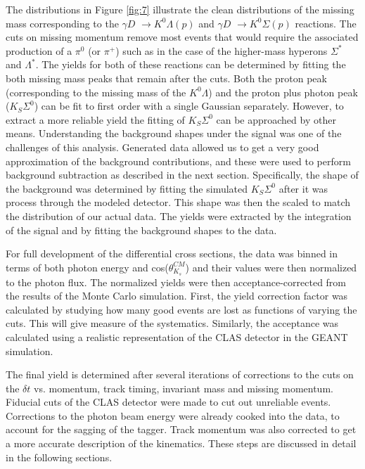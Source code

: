 \documentclass[prb,10pt,twocolumn,tightenlines,superscriptaddress]{revtex4-1}
\begin{document}
The distributions in Figure \ref{fig:7} illustrate the clean distributions of the missing mass corresponding to the $\gamma D$ $\longrightarrow K^{0}\Lambda(p)$ and $\gamma D$ $\longrightarrow K^{0}\Sigma(p)$ reactions. The cuts on missing momentum remove most events that would require the associated production of a $\pi^{0}$ (or $\pi^{+}$) such as in the case of the higher-mass hyperons $\Sigma^{*}$ and $\Lambda^{*}$. The yields for both of these reactions can be determined by fitting the both missing mass peaks that remain after the cuts. Both the proton peak (corresponding to the missing mass of the ${K}^{0}\Lambda$) and the proton plus photon peak ($K_{S}\Sigma^{0}$) can be fit to first order with a single Gaussian separately. However, to extract a more reliable yield the fitting of $K_{S}\Sigma^{0}$ can be approached by other means. Understanding the background shapes under the signal was one of the challenges of this analysis. Generated data allowed us to get a very good approximation of the background contributions, and these were used to perform background subtraction as described in the next section. Specifically, the shape of the background was determined by fitting the simulated $K_{S}\Sigma^{0}$ after it was process through the modeled detector. This shape was then the scaled to match the distribution of our actual data. The yields were extracted by the integration of the signal and by fitting the background shapes to the data. 

For full development of the differential cross sections, the data was binned in terms of both photon energy and cos($\theta^{CM}_{K_{s}}$) and their values were then normalized to the photon flux. The normalized yields were then acceptance-corrected from the results of the Monte Carlo simulation. First, the yield correction factor was calculated by studying how many good events are lost as functions of varying the cuts. This will give measure of the systematics. Similarly, the acceptance was calculated using a realistic representation of the CLAS detector in the GEANT simulation.

The final yield is determined after several iterations of corrections to the cuts on the $\delta t$ vs. momentum, track timing, invariant mass and missing momentum. Fiducial cuts of the CLAS detector were made to cut out unreliable events. Corrections to the photon beam energy were already cooked into the data, to account for the sagging of the tagger. Track momentum was also corrected to get a more accurate description of the kinematics. These steps are discussed in detail in the following sections.
\end{document}
